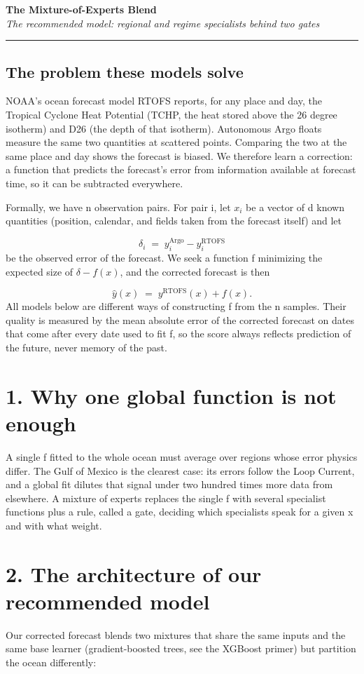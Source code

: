 \documentclass[11pt]{article}
\begin{document}
{\huge\bfseries The Mixture-of-Experts Blend}\\[2.5mm]
{\large\itshape The recommended model: regional and regime specialists behind two gates}\\[2mm]
\hrule\vspace{5mm}

\subsection*{The problem these models solve}
NOAA's ocean forecast model RTOFS reports, for any place and day, the Tropical Cyclone Heat Potential (TCHP, the heat stored above the 26 degree isotherm) and D26 (the depth of that isotherm). Autonomous Argo floats measure the same two quantities at scattered points. Comparing the two at the same place and day shows the forecast is biased. We therefore learn a correction: a function that predicts the forecast's error from information available at forecast time, so it can be subtracted everywhere.

Formally, we have n observation pairs. For pair i, let $x_i$ be a vector of d known quantities (position, calendar, and fields taken from the forecast itself) and let

\[ \delta_i \;=\; y_i^{\mathrm{Argo}} - y_i^{\mathrm{RTOFS}} \]
be the observed error of the forecast. We seek a function f minimizing the expected size of $\delta-f(x)$, and the corrected forecast is then

\[ \hat{y}(x) \;=\; y^{\mathrm{RTOFS}}(x) + f(x). \]
All models below are different ways of constructing f from the n samples. Their quality is measured by the mean absolute error of the corrected forecast on dates that come after every date used to fit f, so the score always reflects prediction of the future, never memory of the past.

\section*{1. Why one global function is not enough}
A single f fitted to the whole ocean must average over regions whose error physics differ. The Gulf of Mexico is the clearest case: its errors follow the Loop Current, and a global fit dilutes that signal under two hundred times more data from elsewhere. A mixture of experts replaces the single f with several specialist functions plus a rule, called a gate, deciding which specialists speak for a given x and with what weight.

\section*{2. The architecture of our recommended model}
Our corrected forecast blends two mixtures that share the same inputs and the same base learner (gradient-boosted trees, see the XGBoost primer) but partition the ocean differently:
\end{document}
